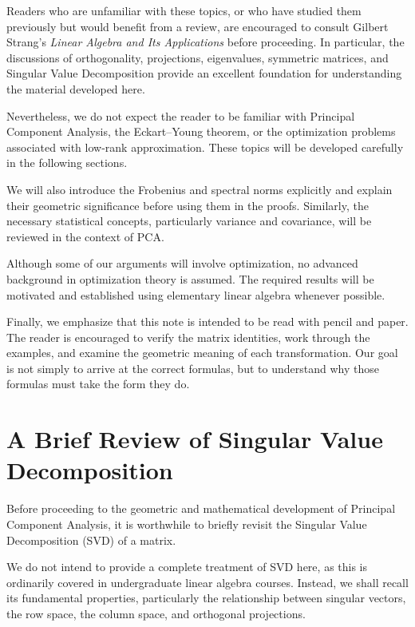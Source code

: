 \documentclass[11pt]{article}
\begin{document}
Readers who are unfamiliar with these topics,
or who have studied them previously but would
benefit from a review, are encouraged to consult
Gilbert Strang's \textit{Linear
Algebra and Its Applications} before proceeding. In particular,
the discussions of orthogonality, projections,
eigenvalues, symmetric matrices, and Singular
Value Decomposition provide an excellent
foundation for understanding the material
developed here.

Nevertheless, we do not expect the reader
to be familiar with Principal Component
Analysis, the Eckart--Young theorem, or
the optimization problems associated with
low-rank approximation. These topics will
be developed carefully in the following
sections.

We will also introduce the Frobenius and
spectral norms explicitly and explain their
geometric significance before using them
in the proofs. Similarly, the necessary
statistical concepts, particularly variance
and covariance, will be reviewed in the
context of PCA.

Although some of our arguments will involve
optimization, no advanced background in
optimization theory is assumed. The required
results will be motivated and established
using elementary linear algebra whenever
possible.

Finally, we emphasize that this note is
intended to be read with pencil and paper.
The reader is encouraged to verify the
matrix identities, work through the examples,
and examine the geometric meaning of each
transformation. Our goal is not simply
to arrive at the correct formulas, but
to understand why those formulas must
take the form they do.









\section{A Brief Review of Singular Value
Decomposition}

Before proceeding to the geometric and mathematical
development of Principal Component Analysis,
it is worthwhile to briefly revisit the Singular
Value Decomposition (SVD) of a matrix.

We do not intend to provide a complete treatment
of SVD here, as this is ordinarily covered in
undergraduate linear algebra courses. Instead,
we shall recall its fundamental properties,
particularly the relationship between singular
vectors, the row space, the column space, and
orthogonal projections.
\end{document}
